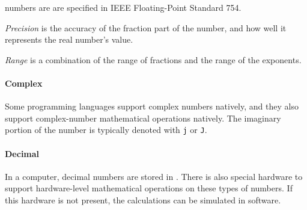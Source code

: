  numbers are are specified in IEEE Floating-Point Standard 754.

\begin{definition}\label{def:Floating_Point_Precision}
  \emph{Precision} is the accuracy of the fraction part of the  number, and how well it represents the real number's value.
\end{definition}

\begin{definition}\label{def:Floating_Point_Range}
  \emph{Range} is a combination of the range of fractions and the range of the exponents.
\end{definition}

\paragraph{Complex}\label{par:Complex_Numeric_Primitive_Data_Type}
Some programming languages support complex numbers natively, and they also support complex-number mathematical operations natively.
The imaginary portion of the number is typically denoted with \texttt{j} or \texttt{J}.

\paragraph{Decimal}\label{par:Decimal_Numeric_Primitive_Data_Type}
In a computer, decimal numbers are stored in .
There is also special hardware to support hardware-level mathematical operations on these types of numbers.
If this hardware is not present, the calculations can be simulated in software.

